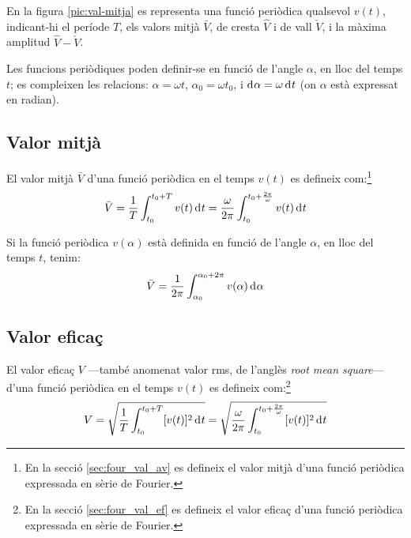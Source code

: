 En la figura \vref{pic:val-mitja} es representa una funció periòdica qualsevol $v(t)$, indicant-hi el període $T$, els valors mitjà $\bar{V}$, de cresta $\hat{V}$ i de vall $\check{V}$, i la màxima amplitud  $\hat{V}-\check{V}$.
\begin{center}
    
    \label{pic:val-mitja}
\end{center}

Les funcions periòdiques poden  definir-se en funció de l'angle $\alpha$, en lloc del temps $t$; es compleixen les relacions:
$\alpha=\omega t$, $\alpha_0=\omega t_0$, i $\diff\alpha=\omega\diff t$ (on $\alpha$ està expressat  en radian).

\subsection{Valor mitjà}

El valor mitjà $\bar{V}$ d'una funció
periòdica en el temps $v(t)$ es
defineix com:\footnote{En la secció \ref{sec:four_val_av} es defineix el valor mitjà d'una funció periòdica expressada en sèrie de Fourier.}
\begin{equation}
    \bar{V} = \frac{1}{T} \int_{t_0}^{t_0+T} v(t) \diff t =
    \frac{\omega}{2\pi} \int_{t_0}^{t_0+\frac{2\pi}{\omega}} v(t) \diff t\label{eq:vm_t}
\end{equation}

Si la funció periòdica $v(\alpha)$ està definida en funció de
l'angle $\alpha$, en lloc del temps $t$, tenim:
\begin{equation}
    \bar{V} = \frac{1}{2\pi} \int_{\alpha_0}^{\alpha_0+2\pi} v(\alpha) \diff \alpha
    \label{eq:vm_alfa}
\end{equation}

\subsection{Valor eficaç}

El valor eficaç  $V$ ---també anomenat valor rms, de l'anglès \textit{root mean square}--- d'una funció periòdica en el temps $v(t)$ es defineix com:\footnote{En la secció \ref{sec:four_val_ef} es defineix el valor eficaç d'una funció periòdica expressada en sèrie de Fourier.}
\begin{equation}
    V = \sqrt{\frac{1}{T} \int_{t_0}^{t_0+T} [v(t)]^2 \diff
    t} = \sqrt{\frac{\omega}{2\pi} \int_{t_0}^{t_0+\frac{2\pi}{\omega}}
     [v(t)]^2 \diff t}
\end{equation}

